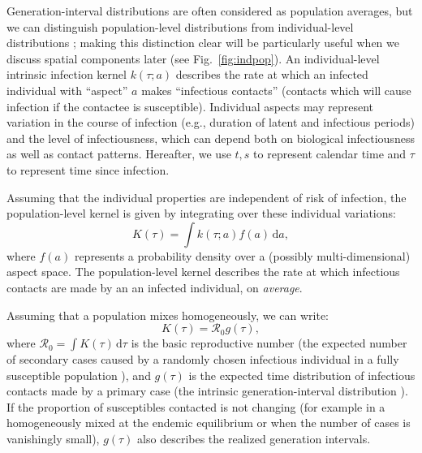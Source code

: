 \documentclass[12pt]{article}
\newcommand{\fref}[1]{Fig.~\ref{fig:#1}}
\newcommand{\RR}{\ensuremath{{\mathcal R}}}
\begin{document}
Generation-interval distributions are often considered as population averages, but we can distinguish population-level distributions from individual-level distributions \citep{svensson2007note, svensson2015influence}; 
making this distinction clear will be particularly useful when we discuss spatial components later (see \fref{indpop}).
An individual-level intrinsic infection kernel $k(\tau; a)$ describes the rate at which an infected individual with ``aspect'' $a$ makes ``infectious contacts'' (contacts which will cause infection if the contactee is susceptible).
Individual aspects may represent variation in the course of infection (e.g., duration of latent and infectious periods) and the level of infectiousness, which can depend both on biological infectiousness as well as contact patterns.
Hereafter, we use $t, s$ to represent calendar time and $\tau$ to
represent time since infection.

Assuming that the individual properties are independent of risk of infection, the population-level kernel is given by integrating over these individual variations:
\begin{equation}
K(\tau) = \int k (\tau; a) f(a) \,\mathrm{d}a,
\end{equation}
where $f(a)$ represents a probability density over a (possibly multi-dimensional) aspect space.
The population-level kernel describes the rate at which infectious contacts are made by an an infected individual, on \emph{average}.

Assuming that a population mixes homogeneously, we can write: 
\begin{equation}
K(\tau) = \RR_0 g(\tau),
\end{equation}
where $\RR_0 = \int K(\tau)\,\mathrm{d}\tau$ is the basic reproductive number (the expected number of secondary cases caused by a randomly chosen infectious individual in a fully susceptible population \citep{anderson1991infectious}), 
and $g(\tau)$ is the expected time distribution of infectious contacts made by a primary case (the intrinsic generation-interval distribution \citep{champredon2015intrinsic}).
If the proportion of susceptibles contacted is not changing (for example in a homogeneously mixed at the endemic equilibrium or when the number of cases is vanishingly small), $g(\tau)$ also describes the realized generation intervals.
\end{document}
